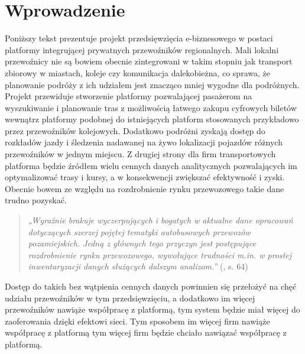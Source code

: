 \chapter{Wprowadzenie}
\label{chap:pierwszy}


Poniższy tekst prezentuje projekt przedsięwzięcia e-biznesowego w postaci platformy integrującej prywatnych przewoźników regionalnych. Mali lokalni przewoźnicy nie są bowiem obecnie zintegrowani w takim stopniu jak transport zbiorowy w miastach, koleje czy komunikacja dalekobieżna, co sprawa, że planowanie podróży z ich udziałem jest znacząco mniej wygodne dla podróżnych. Projekt przewiduje stworzenie platformy pozwalającej pasażerom na wyszukiwanie i planowanie tras z możliwością łatwego zakupu cyfrowych biletów wewnątrz platformy podobnej do istniejących platform stosowanych przykładowo przez przewoźników kolejowych. \citep{Drewnowski_Małachowski_2018} Dodatkowo podróżni zyskają dostęp do rozkładów jazdy i śledzenia nadawanej na żywo lokalizacji pojazdów różnych przewoźników w jednym miejscu. Z drugiej strony dla firm transportowych platforma będzie źródłem wielu cennych danych analitycznych pozwalających im optymalizować trasy i kursy, a w konsekwencji zwiększać efektywność i zyski. Obecnie bowem ze względu na rozdrobnienie rynku przewozowego takie dane trudno pozyskać.
\begin{quote}
    \textit{„Wyraźnie brakuje wyczerpujących i bogatych w aktualne dane opracowań dotyczących szerzej pojętej tematyki autobusowych przewozów pozamiejskich. Jedną z głównych tego przyczyn jest postępujące rozdrobnienie rynku przewozowego, wywołujące trudności m.in. w prostej inwentaryzacji danych służących dalszym analizom.”} (\citealt{Wolański_Mrozowski_Pieróg_2016}, s. 64)
\end{quote}
Dostęp do takich bez wątpienia cennych danych powinnien się przełożyć na chęć udziału przewoźników w tym przedsięwzięciu, a dodatkowo im więcej przewoźników nawiąże współpracę z platformą, tym system będzie miał więcej do zaoferowania dzięki efektowi sieci. Tym sposobem im więcej firm nawiąże współpracę z platformą tym więcej firm będzie chciało nawiązać współpracę z platformą.

